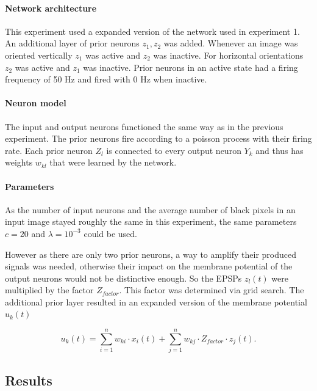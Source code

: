 \paragraph{Network architecture}

This experiment used a expanded version of the network used in experiment 1. An additional layer of prior neurons $z_1,z_2$ was added. Whenever an image was oriented vertically $z_1$ was active and $z_2$ was inactive. For horizontal orientations $z_2$ was active and $z_1$ was inactive. Prior neurons in an active state had a firing frequency of 50 Hz and fired with 0 Hz when inactive.

\paragraph{Neuron model}
The input and output neurons functioned the same way as in the previous experiment. The prior neurons fire according to a poisson process with their firing rate. Each prior neuron $Z_l$ is connected to every output neuron $Y_k$ and thus has weights $w_{kl}$ that were learned by the network. 

\paragraph{Parameters}
As the number of input neurons and the average number of black pixels in an input image stayed roughly the same in this experiment, the same parameters $c=  20$ and $\lambda = 10^{-3}$ could be used.

 However as there are only two prior neurons, a way to amplify their produced signals was needed, otherwise their impact on the membrane potential of the output neurons would not be distinctive enough. So the EPSPs $z_l(t)$ were multiplied by the factor $Z_{factor}$. This factor was determined via grid search. The additional prior layer resulted in an expanded version of the membrane potential $u_k(t)$

\begin{equation}
\label{eqn:ukHorvert}
u_k(t) = \sum_{i=1}^n w_{ki} \cdot x_i(t) + \sum_{j=1}^n w_{kj} \cdot Z_{factor} \cdot z_j(t).
\end{equation}


\subsection{Results} 


